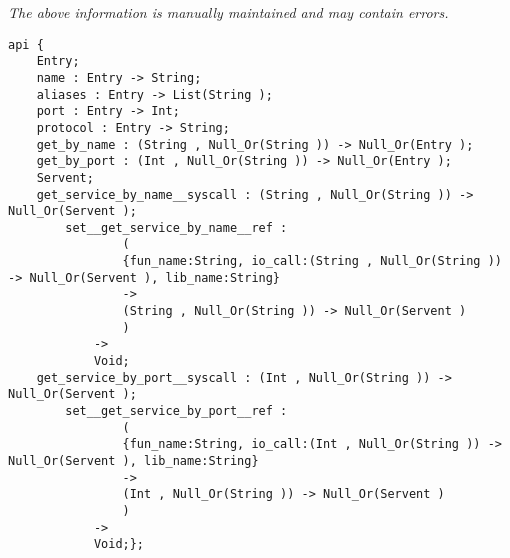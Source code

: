 \label{api:Net\_Service\_Db}

{\tiny \it The above information is manually maintained and may contain errors.}
\begin{verbatim}
api {
    Entry;
    name : Entry -> String;
    aliases : Entry -> List(String );
    port : Entry -> Int;
    protocol : Entry -> String;
    get_by_name : (String , Null_Or(String )) -> Null_Or(Entry );
    get_by_port : (Int , Null_Or(String )) -> Null_Or(Entry );
    Servent;
    get_service_by_name__syscall : (String , Null_Or(String )) -> Null_Or(Servent );
        set__get_service_by_name__ref :
                (
                {fun_name:String, io_call:(String , Null_Or(String )) -> Null_Or(Servent ), lib_name:String}
                ->
                (String , Null_Or(String )) -> Null_Or(Servent )
                )
            ->
            Void;
    get_service_by_port__syscall : (Int , Null_Or(String )) -> Null_Or(Servent );
        set__get_service_by_port__ref :
                (
                {fun_name:String, io_call:(Int , Null_Or(String )) -> Null_Or(Servent ), lib_name:String}
                ->
                (Int , Null_Or(String )) -> Null_Or(Servent )
                )
            ->
            Void;};
\end{verbatim}
